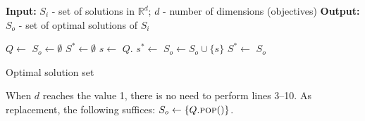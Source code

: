 \begin{algorithm}[h]
	\begin{algorithmic}[0]
		\Statex
		\State\textbf{\hspace{-7pt}Input:} $S_i$ - set of solutions in $\mathbb{R}^d$; $d$ - number of dimensions (objectives)
		\State\textbf{\hspace{-7pt}Output:} $S_o$ - set of optimal solutions of $S_i$
	\end{algorithmic}
	\begin{algorithmic}[1]
		\vspace{3pt}
		\State $Q \leftarrow$  
		\State $S_o \leftarrow \emptyset$
		\State $S^\ast \leftarrow \emptyset$ 
		\State $s \leftarrow$ $Q$. 
		\State $s^\ast \leftarrow$  
		\State $S_o \leftarrow S_o \cup \{s\}$
		\State $S^\ast \leftarrow$ 
		\EndIf
		\EndWhile
		\State \Return $S_o$
		\EndFunction
	\end{algorithmic}
	\caption{Optimal solution set \cite{kung_optima, preparata_comp_geom, fonseca_eaf}}
	\label{alg:optima}
	\algrule[1pt]
	\small When $d$ reaches the value 1, there is no need to perform lines 3--10. As replacement, the following suffices: $S_o \leftarrow \{Q.\textsc{pop}(\null)\}$.
\end{algorithm}